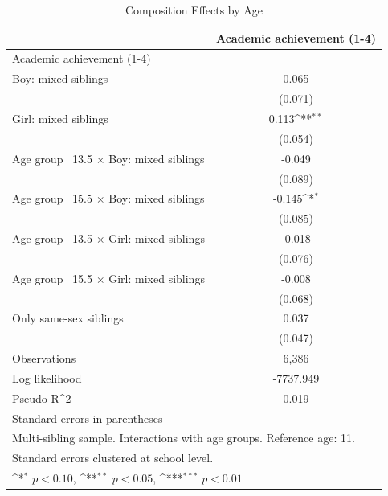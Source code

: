 \documentclass[12pt]{article}
\begin{document}
\begin{table}[htbp]\centering
\def\sym#1{\ifmmode^{#1}\else\(^{#1}\)\fi}
\caption{Composition Effects by Age\label{tab:comp\_age}}
\begin{tabular}{l*{1}{c}}
\toprule
                &\multicolumn{1}{c}{Academic achievement (1-4)}\\
\midrule
Academic achievement (1-4)&                  \\
Boy: mixed siblings&    0.065         \\
                &  (0.071)         \\
Girl: mixed siblings&    0.113\sym{**} \\
                &  (0.054)         \\
Age group ~13.5 $\times$ Boy: mixed siblings&   -0.049         \\
                &  (0.089)         \\
Age group ~15.5 $\times$ Boy: mixed siblings&   -0.145\sym{*}  \\
                &  (0.085)         \\
Age group ~13.5 $\times$ Girl: mixed siblings&   -0.018         \\
                &  (0.076)         \\
Age group ~15.5 $\times$ Girl: mixed siblings&   -0.008         \\
                &  (0.068)         \\
Only same-sex siblings&    0.037         \\
                &  (0.047)         \\
\midrule
Observations    &    6,386         \\
Log likelihood  &-7737.949         \\
Pseudo R^2      &    0.019         \\
\bottomrule
\multicolumn{2}{l}{\footnotesize Standard errors in parentheses}\\
\multicolumn{2}{l}{\footnotesize Multi-sibling sample. Interactions with age groups. Reference age: 11.}\\
\multicolumn{2}{l}{\footnotesize Standard errors clustered at school level.}\\
\multicolumn{2}{l}{\footnotesize \sym{*} \(p<0.10\), \sym{**} \(p<0.05\), \sym{***} \(p<0.01\)}\\
\end{tabular}
\end{table}
\end{document}
